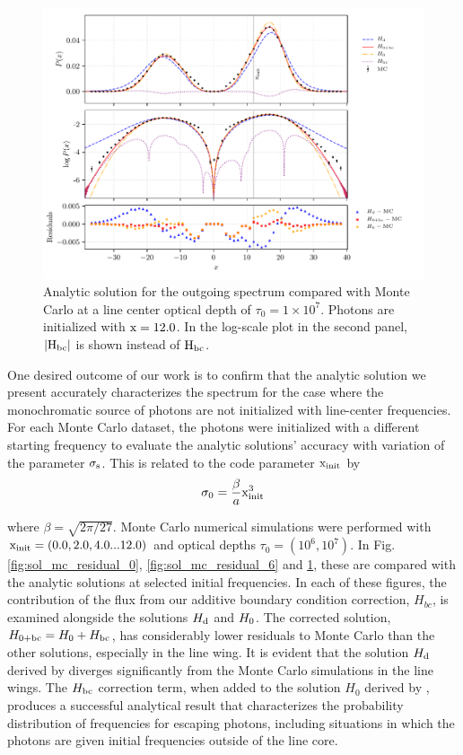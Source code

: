 \documentclass[onecolumn]{aastex63}
\begin{document}
\begin{figure}
    \centering
    \includegraphics{pdf_xinit12.pdf}
    \caption{Analytic solution for the outgoing spectrum compared with Monte Carlo at a line center optical depth of $\tau_0 = 1 \times 10^7$. Photons are initialized with $\rm x = 12.0$. In the log-scale plot in the second panel, $|\rm H_{bc}|$ is shown instead of $\rm H_{bc}$.} 
    \label{fig:sol_mc_residual_12}
\end{figure}

One desired outcome of our work is to confirm that the analytic solution we present accurately characterizes the spectrum for the case where the monochromatic source of photons are not initialized with line-center frequencies. For each Monte Carlo dataset, the photons were initialized with a different starting frequency to evaluate the analytic solutions' accuracy with variation of the parameter $\rm \sigma_s$. This is related to the code parameter $\rm x_{init}$ by 
\begin{equation} \label{sigma0_xinit}
    \sigma_0 = \frac{\beta}{a} \rm x_{init}^3
\end{equation}

where $\beta = \sqrt{2 \pi / 27}$. Monte Carlo numerical simulations were performed with $\rm x_{init} = (0.0, 2.0, 4.0 ... 12.0)$ and optical depths $\tau_0 = (10^6, 10^7)$. In Fig. \ref{fig:sol_mc_residual_0}, \ref{fig:sol_mc_residual_6} and \ref{fig:sol_mc_residual_12}, these are compared with the analytic solutions at selected initial frequencies. In each of these figures, the contribution of the flux from our additive boundary condition correction, $H_{bc}$, is examined alongside the solutions $H_{\rm d}$ and $H_{\rm 0}$. The corrected solution, $H_{\rm 0 + bc} = H_{\rm 0} + H_{\rm bc}$, has considerably lower residuals to Monte Carlo than the other solutions, especially in the line wing. It is evident that the solution $H_{\rm d}$ derived by \citet{harrington1973} diverges significantly from the Monte Carlo simulations in the line wings. The $H_{\rm bc}$ correction term, when added to the solution $H_0$ derived by \citet{2006ApJ...649...14D}, produces a successful analytical result that characterizes the probability distribution of frequencies for escaping photons, including situations in which the photons are given initial frequencies outside of the line core.
\end{document}
